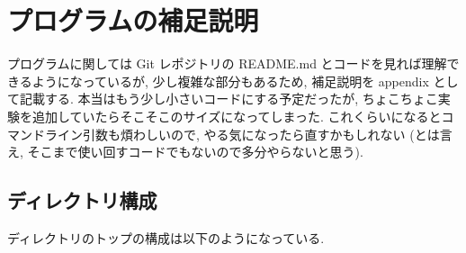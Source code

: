\section{プログラムの補足説明}
\label{sec:appendix-program}
プログラムに関しては Git レポジトリの README.md とコードを見れば理解できるようになっているが, 少し複雑な部分もあるため, 補足説明を appendix として記載する.
本当はもう少し小さいコードにする予定だったが, ちょこちょこ実験を追加していたらそこそこのサイズになってしまった.
これくらいになるとコマンドライン引数も煩わしいので, やる気になったら直すかもしれない (とは言え, そこまで使い回すコードでもないので多分やらないと思う).


\subsection{ディレクトリ構成}
\label{subsec:appendix-directory}
ディレクトリのトップの構成は以下のようになっている.
%
